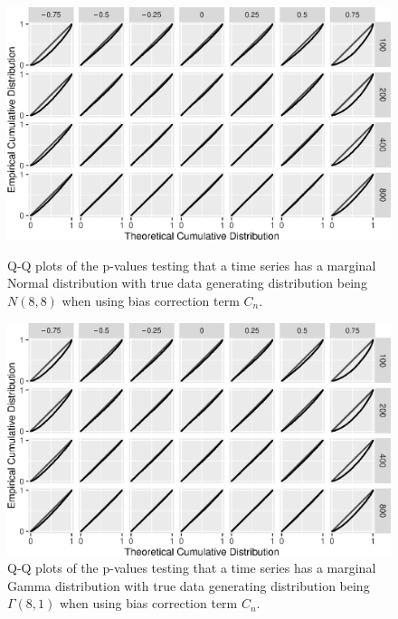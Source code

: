 \documentclass[12pt]{article}
\begin{document}
\begin{figure}[tbp]
  \includegraphics[width = .9\textwidth]{figures/normal_C_n}
  \centering
  \vspace{-10pt}
  \caption{Q-Q plots of the p-values testing that a time series
    has a marginal Normal distribution with true data generating distribution
    being $N(8,8)$ when using  bias correction term $C_n$.}
  \label{fig:qq_n_C_n}
    \hspace{3cm}
  \includegraphics[width = .9\textwidth]{figures/gamma_C_n}
  \vspace{-5pt}
  \caption{Q-Q plots of the p-values testing that a time series
    has a marginal Gamma distribution with true data generating distribution
    being $\Gamma(8,1)$ when using  bias correction term $C_n$.}
  \label{fig:qq_g_C_n}
\end{figure}
\end{document}
